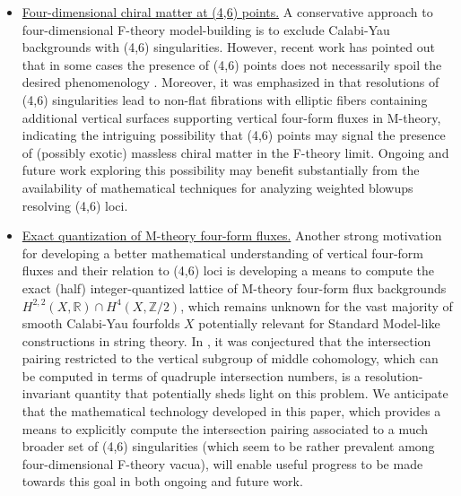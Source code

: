 \documentclass[11pt,oneside,english]{article}
\numberwithin{equation}{section}
\theoremstyle{definition}
\begin{document}
\begin{itemize}
 \item \underline{Four-dimensional chiral matter at (4,6) points.} A conservative approach to four-dimensional F-theory model-building is to exclude Calabi-Yau backgrounds with (4,6) singularities. However, recent work has pointed out that in some cases the presence of (4,6) points does not necessarily spoil the desired phenomenology \cite{achmed2018note}. Moreover, it was emphasized in \cite{Jefferson:2021bid} that resolutions of (4,6) singularities lead to non-flat fibrations with elliptic fibers containing additional vertical surfaces supporting vertical four-form fluxes in M-theory, indicating the intriguing possibility that (4,6) points may  signal the presence of (possibly exotic) massless chiral matter in the F-theory limit. Ongoing \cite{JLT} and future work exploring this possibility may benefit substantially from the availability of mathematical techniques for analyzing weighted blowups resolving (4,6) loci.
 
 \item \underline{Exact quantization of M-theory four-form fluxes.} Another strong motivation for developing a better mathematical understanding of vertical four-form fluxes and their relation to (4,6) loci is developing a means to compute the exact (half) integer-quantized lattice of M-theory four-form flux backgrounds $H^{2,2}(X, \mathbb R) \cap H^4(X,\mathbb Z/2)$, which remains unknown for the vast majority of smooth Calabi-Yau fourfolds $X$ potentially relevant for Standard Model-like constructions in string theory. In \cite{Jefferson:2021bid}, it was conjectured that the intersection pairing restricted to the vertical subgroup of middle cohomology, which can be computed in terms of quadruple intersection numbers, is a resolution-invariant quantity that potentially sheds light on this problem. We anticipate that the mathematical technology developed in this paper, which provides a means to explicitly compute the intersection pairing associated to a much broader set of (4,6) singularities (which seem to be rather prevalent among four-dimensional F-theory vacua), will enable useful progress to be made towards this goal in both ongoing \cite{JKT} and future work. 


\end{itemize}
\end{document}
